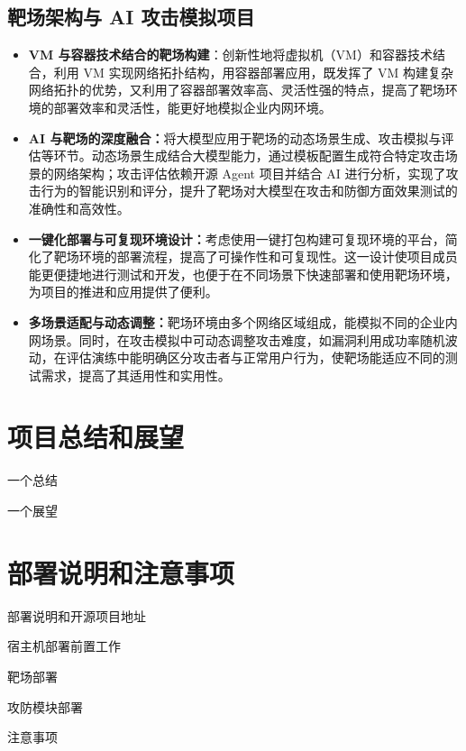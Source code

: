 \documentclass[lang=cn,10pt]{elegantbook}
\begin{document}
\section{靶场架构与 AI 攻击模拟项目}
\begin{itemize}
    \item \textbf{VM 与容器技术结合的靶场构建}：创新性地将虚拟机（VM）和容器技术结合，利用 VM 实现网络拓扑结构，用容器部署应用，既发挥了 VM 构建复杂网络拓扑的优势，又利用了容器部署效率高、灵活性强的特点，提高了靶场环境的部署效率和灵活性，能更好地模拟企业内网环境。
    \item \textbf{AI 与靶场的深度融合：}将大模型应用于靶场的动态场景生成、攻击模拟与评估等环节。动态场景生成结合大模型能力，通过模板配置生成符合特定攻击场景的网络架构；攻击评估依赖开源 Agent 项目并结合 AI 进行分析，实现了攻击行为的智能识别和评分，提升了靶场对大模型在攻击和防御方面效果测试的准确性和高效性。
    \item \textbf{一键化部署与可复现环境设计：}考虑使用一键打包构建可复现环境的平台，简化了靶场环境的部署流程，提高了可操作性和可复现性。这一设计使项目成员能更便捷地进行测试和开发，也便于在不同场景下快速部署和使用靶场环境，为项目的推进和应用提供了便利。
    \item \textbf{多场景适配与动态调整：}靶场环境由多个网络区域组成，能模拟不同的企业内网场景。同时，在攻击模拟中可动态调整攻击难度，如漏洞利用成功率随机波动，在评估演练中能明确区分攻击者与正常用户行为，使靶场能适应不同的测试需求，提高了其适用性和实用性。
\end{itemize}


\chapter{项目总结和展望}
\begin{introduction}
  \item 一个总结
  \item 一个展望
\end{introduction}


\chapter{部署说明和注意事项}

\begin{introduction}
    \item 部署说明和开源项目地址
    \item 宿主机部署前置工作
    \item 靶场部署
    \item 攻防模块部署
    \item 注意事项
\end{introduction}
\end{document}
